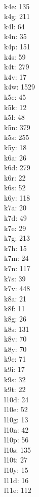 \begin{multicols}{8}
  \\ k4e: 135
  \\ k4g: 211
  \\ k4l: 64
  \\ k4n: 35
  \\ k4p: 151
  \\ k4s: 59
  \\ k4t: 279
  \\ k4v: 17
  \\ k4w: 1529
  \\ k5e: 45
  \\ k5k: 12
  \\ k5l: 48
  \\ k5n: 379
  \\ k5s: 255
  \\ k5y: 18
  \\ k6a: 26
  \\ k6d: 279
  \\ k6r: 22
  \\ k6s: 52
  \\ k6y: 118
  \\ k7a: 20
  \\ k7d: 49
  \\ k7e: 29
  \\ k7g: 213
  \\ k7h: 15
  \\ k7m: 24
  \\ k7n: 117
  \\ k7s: 39
  \\ k7v: 448
  \\ k8a: 21
  \\ k8f: 11
  \\ k8g: 26
  \\ k8s: 131
  \\ k8v: 70
  \\ k8y: 70
  \\ k9e: 71
  \\ k9i: 17
  \\ k9s: 32
  \\ k9t: 22
  \\ l10d: 24
  \\ l10e: 52
  \\ l10g: 13
  \\ l10n: 42
  \\ l10p: 56
  \\ l10s: 135
  \\ l10t: 27
  \\ l10y: 15
  \\ l11d: 16
  \\ l11e: 112

\end{multicols}
